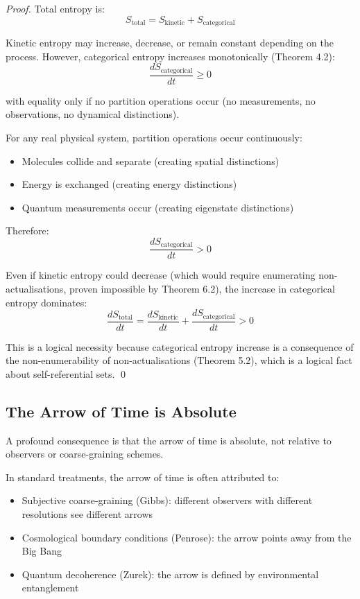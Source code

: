 \documentclass[twocolumn,10pt]{article}
\theoremstyle{definition}
\theoremstyle{remark}
\begin{document}
\begin{proof}
Total entropy is:
$$
S_{\text{total}} = S_{\text{kinetic}} + S_{\text{categorical}}
$$

Kinetic entropy may increase, decrease, or remain constant depending on the process. However, categorical entropy increases monotonically (Theorem 4.2):
$$
\frac{dS_{\text{categorical}}}{dt} \geq 0
$$

with equality only if no partition operations occur (no measurements, no observations, no dynamical distinctions).

For any real physical system, partition operations occur continuously:
\begin{itemize}
\item Molecules collide and separate (creating spatial distinctions)
\item Energy is exchanged (creating energy distinctions)
\item Quantum measurements occur (creating eigenstate distinctions)
\end{itemize}

Therefore:
$$
\frac{dS_{\text{categorical}}}{dt} > 0
$$

Even if kinetic entropy could decrease (which would require enumerating non-actualisations, proven impossible by Theorem 6.2), the increase in categorical entropy dominates:
$$
\frac{dS_{\text{total}}}{dt} = \frac{dS_{\text{kinetic}}}{dt} + \frac{dS_{\text{categorical}}}{dt} > 0
$$

This is a logical necessity because categorical entropy increase is a consequence of the non-enumerability of non-actualisations (Theorem 5.2), which is a logical fact about self-referential sets. \qed
\end{proof}

\subsection{The Arrow of Time is Absolute}

A profound consequence is that the arrow of time is absolute, not relative to observers or coarse-graining schemes.

In standard treatments, the arrow of time is often attributed to:
\begin{itemize}
\item Subjective coarse-graining (Gibbs): different observers with different resolutions see different arrows
\item Cosmological boundary conditions (Penrose): the arrow points away from the Big Bang
\item Quantum decoherence (Zurek): the arrow is defined by environmental entanglement
\end{itemize}
\end{document}
